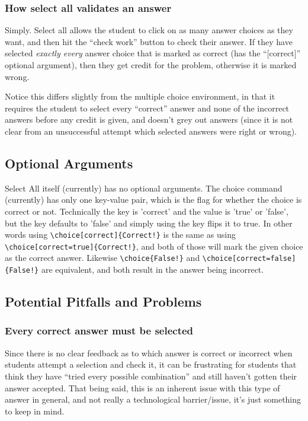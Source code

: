 \documentclass{ximera}
\begin{document}
        
    \subsubsection*{How select all validates an answer}
    
        Simply. Select all allows the student to click on as many answer choices as they want, and then hit the ``check work'' button to check their answer. If they have selected \textit{exactly every} answer choice that is marked as correct (has the ``[correct]'' optional argument), then they get credit for the problem, otherwise it is marked wrong. 
        
        Notice this differs slightly from the multiple choice environment, in that it requires the student to select every ``correct'' answer and none of the incorrect answers before any credit is given, and doesn't grey out answers (since it is not clear from an unsuccessful attempt which selected answers were right or wrong).
        
\subsection*{Optional Arguments}

    Select All itself (currently) has no optional arguments. The choice command (currently) has only one key-value pair, which is the flag for whether the choice is correct or not. Technically the key is 'correct' and the value is 'true' or 'false', but the key defaults to 'false' and simply using the key flips it to true. In other words using \verb|\choice[correct]{Correct!}| is the same as using \verb|\choice[correct=true]{Correct!}|, and both of those will mark the given choice as the correct answer. Likewise \verb|\choice{False!}| and \verb|\choice[correct=false]{False!}| are equivalent, and both result in the answer being incorrect.
    

\subsection*{Potential Pitfalls and Problems}
    
    \subsubsection*{Every correct answer must be selected}
        Since there is no clear feedback as to which answer is correct or incorrect when students attempt a selection and check it, it can be frustrating for students that think they have ``tried every possible combination'' and still haven't gotten their answer accepted. That being said, this is an inherent issue with this type of answer in general, and not really a technological barrier/issue, it's just something to keep in mind.
        
\end{document}
